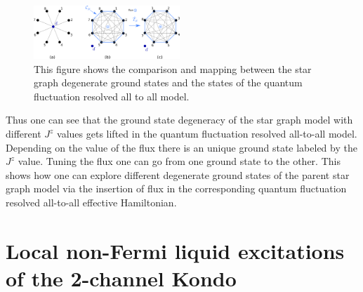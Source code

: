 \documentclass[reprint,prb,superscriptaddress]{revtex4-2}
\begin{document}
\begin{figure}[!htpb]
\centering
\includegraphics[width=0.49\textwidth]{plt/stargraph-to-alltoall}
\caption{This figure shows the comparison and mapping between the star graph degenerate ground states and the states of the quantum fluctuation resolved all to all model.}
\label{fig:stargraph-to-alltoall}
\end{figure}
Thus one can see that the ground state degeneracy of the star graph model with different $J^z$ values gets lifted in the quantum fluctuation resolved all-to-all model. Depending on the value of the flux there is an unique ground state labeled by the $J^z$ value. Tuning the flux one can go from one ground state to the other. This shows how one can explore different degenerate ground states of the parent star graph model via the insertion of flux in the corresponding quantum fluctuation resolved all-to-all effective Hamiltonian.


\section{Local non-Fermi liquid excitations of the 2-channel Kondo}
\end{document}
